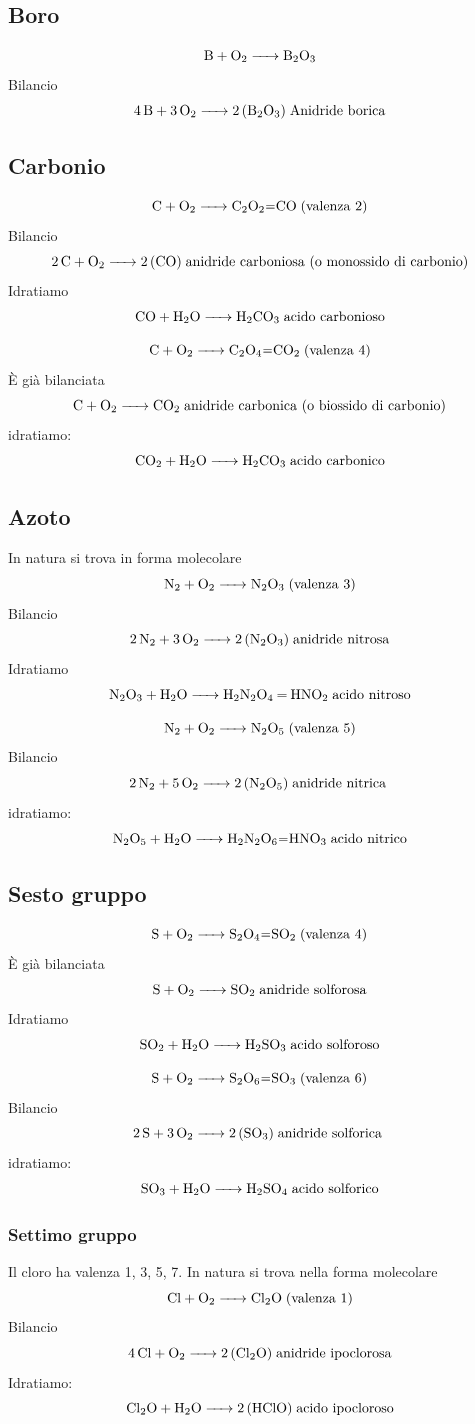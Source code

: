 \subsection{Boro}
$$\ce{B + O_2 -> B_2O_3}$$
Bilancio
$$\ce{4 B + 3 O_2 -> 2 (B_2O_3)} \; \text{Anidride borica}$$
\subsection{Carbonio}
$$\ce{C + O_2 -> C_2O_2=CO} \; \text{(valenza 2)}$$ Bilancio
$$\ce{2 C + O_2 -> 2 (CO)} \; \text{anidride carboniosa (o monossido di carbonio)}$$
Idratiamo
$$\ce{CO + H_2O -> H_2CO_3} \; \text{acido carbonioso}$$

$$\ce{C + O_2 -> C_2O_4=CO_2} \; \text{(valenza 4)}$$ È già bilanciata
$$\ce{C + O_2 -> CO_2} \; \text{anidride carbonica (o biossido di carbonio)}$$
idratiamo:
$$\ce{CO_2 + H_2O -> H_2CO_3} \; \text{acido carbonico}$$
\subsection{Azoto}
In natura si trova in forma molecolare 
$$\ce{N_2 + O_2 -> N_2O_3} \; \text{(valenza 3)}$$ Bilancio
$$\ce{2 N_2 + 3 O_2 -> 2 (N_2O_3)} \; \text{anidride nitrosa}$$
Idratiamo
$$\ce{N_2O_3 + H_2O -> H_2N_2O_4 = HNO_2} \; \text{acido nitroso}$$

$$\ce{N_2 + O_2 -> N_2O_5} \; \text{(valenza 5)}$$ Bilancio
$$\ce{2 N_2 + 5 O_2 -> 2 (N_2O_5)} \; \text{anidride nitrica }$$
idratiamo:
$$\ce{N_2O_5 + H_2O -> H_2N_2O_6=HNO_3} \; \text{acido nitrico}$$
\subsection{Sesto gruppo}
$$\ce{S + O_2 -> S_2O_4=SO_2} \; \text{(valenza 4)}$$ È già bilanciata
$$\ce{S + O_2 -> SO_2} \; \text{anidride solforosa}$$
Idratiamo
$$\ce{SO_2 + H_2O -> H_2SO_3} \; \text{acido solforoso}$$

$$\ce{S + O_2 -> S_2O_6=SO_3} \; \text{(valenza 6)}$$ Bilancio
$$\ce{2 S + 3 O_2 -> 2 (SO_3)} \; \text{anidride solforica }$$
idratiamo:
$$\ce{SO_3 + H_2O -> H_2SO_4} \; \text{acido solforico}$$
\subsubsection{Settimo gruppo}
Il cloro ha valenza 1, 3, 5, 7. In natura si trova nella forma molecolare 
$$\ce{Cl + O_2 -> Cl_2O} \; \text{(valenza 1)}$$ Bilancio
$$\ce{4 Cl + O_2 -> 2 (Cl_2O)} \; \text{anidride ipoclorosa}$$
Idratiamo:
$$\ce{Cl_2O + H_2O -> 2 (HClO)} \; \text{acido ipocloroso}$$

